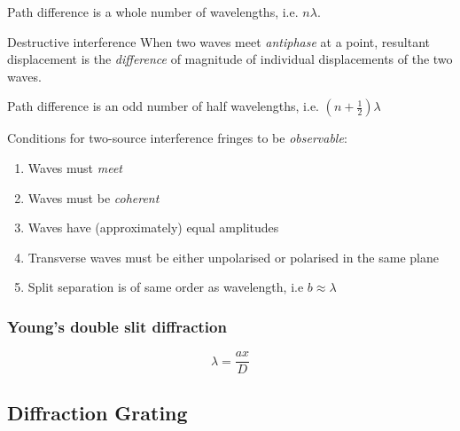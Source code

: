 Path difference is a whole number of wavelengths, i.e. $n\lambda$.

\begin{defn}{Destructive interference}{}
When two waves meet \emph{antiphase} at a point, resultant displacement is the \emph{difference} of magnitude of individual displacements of the two waves.
\end{defn}

Path difference is an odd number of half wavelengths, i.e. $(n+\frac{1}{2})\lambda$

Conditions for two-source interference fringes to be \emph{observable}:
\begin{enumerate}
\item Waves must \emph{meet}
\item Waves must be \emph{coherent}
\item Waves have (approximately) equal amplitudes
\item Transverse waves must be either unpolarised or polarised in the same plane
\item Split separation is of same order as wavelength, i.e $b\approx\lambda$
\end{enumerate}


\subsubsection{Young's double slit diffraction}


\begin{equation}
\lambda=\frac{ax}{D}
\end{equation}

\subsection{Diffraction Grating}

